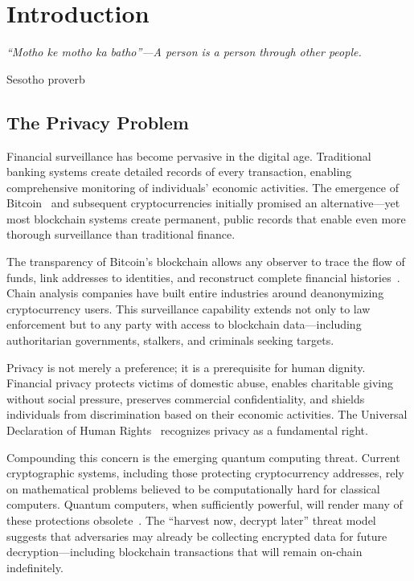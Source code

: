 
\section{Introduction}
\label{sec:introduction}

\epigraph{\textit{``Motho ke motho ka batho''---A person is a person through other people.}}{Sesotho proverb}

\subsection{The Privacy Problem}

Financial surveillance has become pervasive in the digital age. Traditional
banking systems create detailed records of every transaction, enabling
comprehensive monitoring of individuals' economic activities. The emergence
of Bitcoin~\cite{nakamoto2008bitcoin} and subsequent cryptocurrencies
initially promised an alternative---yet most blockchain systems create
permanent, public records that enable even more thorough surveillance than
traditional finance.

The transparency of Bitcoin's blockchain allows any observer to trace the
flow of funds, link addresses to identities, and reconstruct complete
financial histories~\cite{chainanalysis}. Chain analysis companies have built entire industries
around deanonymizing cryptocurrency users. This surveillance capability
extends not only to law enforcement but to any party with access to
blockchain data---including authoritarian governments, stalkers, and
criminals seeking targets.

Privacy is not merely a preference; it is a prerequisite for human dignity.
Financial privacy protects victims of domestic abuse, enables charitable
giving without social pressure, preserves commercial confidentiality, and
shields individuals from discrimination based on their economic activities.
The Universal Declaration of Human Rights~\cite{udhr} recognizes privacy as a
fundamental right.

Compounding this concern is the emerging quantum computing threat. Current
cryptographic systems, including those protecting cryptocurrency addresses,
rely on mathematical problems believed to be computationally hard for
classical computers. Quantum computers, when sufficiently powerful, will
render many of these protections obsolete~\cite{shor,grover}. The ``harvest now, decrypt
later'' threat model suggests that adversaries may already be collecting
encrypted data for future decryption---including blockchain transactions
that will remain on-chain indefinitely.


